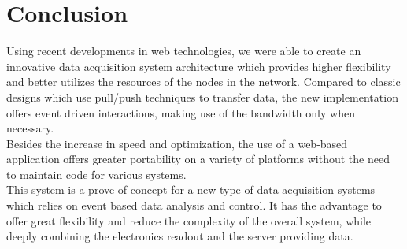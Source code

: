   \section{Conclusion}

    Using recent developments in web technologies, we were able to create an innovative data acquisition system architecture which provides higher flexibility and better utilizes the resources of the nodes in the network. Compared to classic designs which use pull/push techniques to transfer data, the new implementation offers event driven interactions, making use of the bandwidth only when necessary. \\

    Besides the increase in speed and optimization, the use of a web-based application offers greater portability on a variety of platforms without the need to maintain code for various systems. \\

    This system is a prove of concept for a new type of data acquisition systems which relies on event based data analysis and control. It has the advantage to offer great flexibility and reduce the complexity of the overall system, while deeply combining the electronics readout and the server providing data.   

